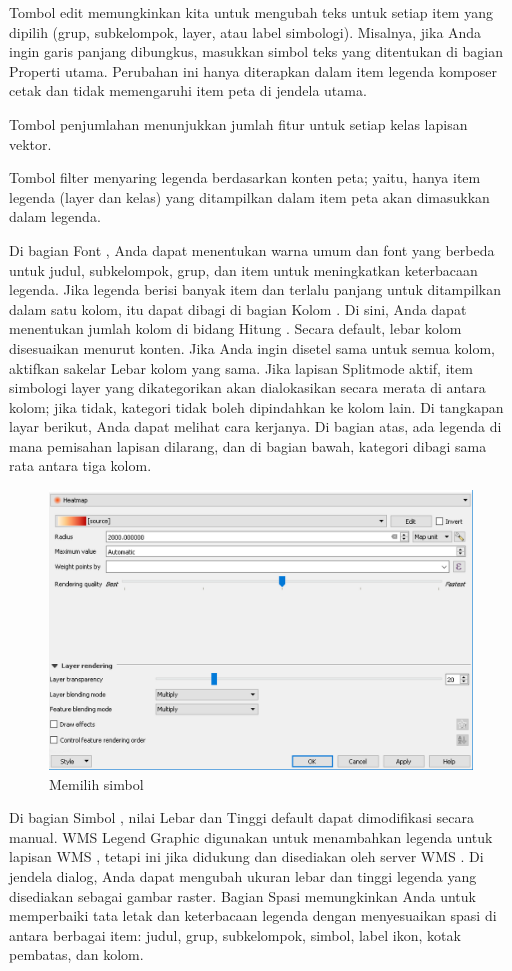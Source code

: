 \documentclass[]{book}
\begin{document}
Tombol edit memungkinkan kita untuk mengubah teks untuk setiap item yang dipilih (grup, subkelompok, layer, atau label simbologi). Misalnya, jika Anda ingin garis panjang dibungkus, masukkan simbol teks yang ditentukan di bagian Properti utama. Perubahan ini hanya diterapkan dalam item legenda komposer cetak dan tidak memengaruhi item peta di jendela utama.

Tombol penjumlahan menunjukkan jumlah fitur untuk setiap kelas lapisan vektor.

Tombol filter menyaring legenda berdasarkan konten peta; yaitu, hanya item legenda (layer dan kelas) yang ditampilkan dalam item peta akan dimasukkan dalam legenda.

Di bagian Font , Anda dapat menentukan warna umum dan font yang berbeda untuk judul, subkelompok, grup, dan item untuk meningkatkan keterbacaan legenda. Jika legenda berisi banyak item dan terlalu panjang untuk ditampilkan dalam satu kolom, itu dapat dibagi di bagian Kolom . Di sini, Anda dapat menentukan jumlah kolom di bidang Hitung . Secara default, lebar kolom disesuaikan menurut konten. Jika Anda ingin disetel sama untuk semua kolom, aktifkan sakelar Lebar kolom yang sama. Jika lapisan Splitmode aktif, item simbologi layer yang dikategorikan akan dialokasikan secara merata di antara kolom; jika tidak, kategori tidak boleh dipindahkan ke kolom lain. Di tangkapan layar berikut, Anda dapat melihat cara kerjanya. Di bagian atas, ada legenda di mana pemisahan lapisan dilarang, dan di bagian bawah, kategori dibagi sama rata antara tiga kolom.

\begin{figure}

{\centering \includegraphics[width=0.6\linewidth]{images/09/fig99} 

}

\caption{Memilih simbol}\label{fig:fig991}
\end{figure}

Di bagian Simbol , nilai Lebar dan Tinggi default dapat dimodifikasi secara manual. WMS Legend Graphic digunakan untuk menambahkan legenda untuk lapisan WMS , tetapi ini jika didukung dan disediakan oleh server WMS . Di jendela dialog, Anda dapat mengubah ukuran lebar dan tinggi legenda yang disediakan sebagai gambar raster. Bagian Spasi memungkinkan Anda untuk memperbaiki tata letak dan keterbacaan legenda dengan menyesuaikan spasi di antara berbagai item: judul, grup, subkelompok, simbol, label ikon, kotak pembatas, dan kolom.
\end{document}
